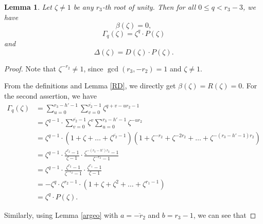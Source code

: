 \documentclass[12pt,a4paper]{article}
\newtheorem{lemma}[theorem]{Lemma}
\theoremstyle{definition}
\newcommand{\z}{\zeta}
\newcommand{\uo}{\overline{r_2}}
\begin{document}
\begin{lemma}
Let $\zeta\neq 1$ be any $r_3$-th root of unity. Then for all $0\leq q<r_3-3$, we have $$\beta(\z)=0,$$ $$\Gamma_q(\zeta)=\zeta^{q}\cdot P(\zeta)$$ and $$\Delta(\zeta)=D(\zeta)\cdot P(\zeta).$$
\end{lemma}
\begin{proof}
Note that $\z^{-r_2}\neq 1$, since $\gcd(r_3,-r_2)=1$ and $\z\neq1$.

From the definitions and Lemma \ref{RD}, we directly get $\beta(\z)=R(\z)=0$. For the second assertion, we have
\begin{equation*}\label{Gamma}
\begin{split}
\Gamma_q(\zeta)&=\sum_{u=0}^{r_3-h'-1}\sum_{v=0}^{\uo-1}\z^{q+v-ur_2-1}\\
&=\z^{q-1}\cdot\sum_{v=0}^{\uo-1}\z^{v}\sum_{u=0}^{r_3-h'-1}\z^{-ur_2}\\
&=\z^{q-1}\cdot(1+\zeta+\dots+\zeta^{\uo-1})(1+\zeta^{-r_2}+\zeta^{-2r_2}+\dots+\zeta^{-(r_3-h'-1)r_2})\\
&=\zeta^{q-1}\cdot\frac{\zeta^{\uo}-1}{\zeta-1}\cdot \frac{\zeta^{-(r_3-h')r_2}-1}{\zeta^{-r_2}-1}\\
&=\zeta^{q-1}\cdot\frac{\zeta^{r_2}-1}{\zeta^{-r_2}-1}\cdot \frac{\zeta^{r_1}-1}{\zeta-1}\\
&=-\zeta^{q}\cdot \zeta^{r_2-1}\cdot (1+\zeta+\zeta^2+\dots+\zeta^{r_1-1})\\
&=\zeta^{q}\cdot P(\zeta).
\end{split}
\end{equation*}

Similarly, using Lemma \ref{argeo} with $a=\overline{-r_2}$ and $b=r_3-1$, we can see that


\end{proof}
\end{document}
